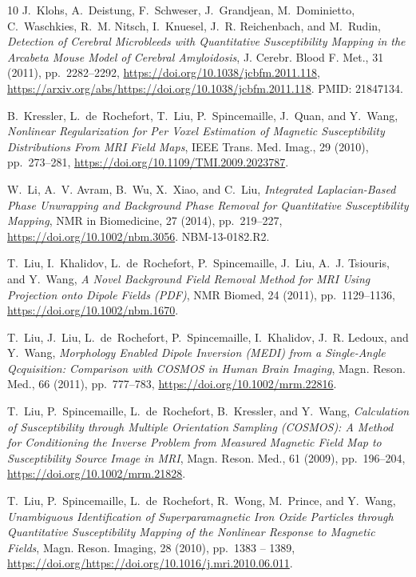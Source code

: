 \documentclass[reqno]{siamonline1116}
\numberwithin{theorem}{section}
\numberwithin{equation}{section}
\begin{document}
\begin{thebibliography}{10}
{\sc J.~Klohs, A.~Deistung, F.~Schweser, J.~Grandjean, M.~Dominietto,
  C.~Waschkies, R.~M. Nitsch, I.~Knuesel, J.~R. Reichenbach, and M.~Rudin},
  {\em {Detection of Cerebral Microbleeds with Quantitative Susceptibility
  Mapping in the Arcabeta Mouse Model of Cerebral Amyloidosis}}, J. Cerebr.
  Blood F. Met., 31 (2011), pp.~2282--2292,
  \url{https://doi.org/10.1038/jcbfm.2011.118},
  \url{https://arxiv.org/abs/https://doi.org/10.1038/jcbfm.2011.118}.
\newblock PMID: 21847134.

{\sc B.~Kressler, L.~de~Rochefort, T.~Liu, P.~Spincemaille, J.~Quan, and
  Y.~Wang}, {\em {Nonlinear Regularization for Per Voxel Estimation of Magnetic
  Susceptibility Distributions From MRI Field Maps}}, IEEE Trans. Med. Imag.,
  29 (2010), pp.~273--281, \url{https://doi.org/10.1109/TMI.2009.2023787}.

{\sc W.~Li, A.~V. Avram, B.~Wu, X.~Xiao, and C.~Liu}, {\em {Integrated
  Laplacian-Based Phase Unwrapping and Background Phase Removal for
  Quantitative Susceptibility Mapping}}, NMR in Biomedicine, 27 (2014),
  pp.~219--227, \url{https://doi.org/10.1002/nbm.3056}.
\newblock NBM-13-0182.R2.

{\sc T.~Liu, I.~Khalidov, L.~de~Rochefort, P.~Spincemaille, J.~Liu, A.~J.
  Tsiouris, and Y.~Wang}, {\em {A Novel Background Field Removal Method for MRI
  Using Projection onto Dipole Fields (PDF)}}, NMR Biomed, 24 (2011),
  pp.~1129--1136, \url{https://doi.org/10.1002/nbm.1670}.

{\sc T.~Liu, J.~Liu, L.~de~Rochefort, P.~Spincemaille, I.~Khalidov, J.~R.
  Ledoux, and Y.~Wang}, {\em {Morphology Enabled Dipole Inversion (MEDI) from a
  Single-Angle Qcquisition: Comparison with COSMOS in Human Brain Imaging}},
  Magn. Reson. Med., 66 (2011), pp.~777--783,
  \url{https://doi.org/10.1002/mrm.22816}.

{\sc T.~Liu, P.~Spincemaille, L.~de~Rochefort, B.~Kressler, and Y.~Wang}, {\em
  {Calculation of Susceptibility through Multiple Orientation Sampling
  (COSMOS): A Method for Conditioning the Inverse Problem from Measured
  Magnetic Field Map to Susceptibility Source Image in MRI}}, Magn. Reson.
  Med., 61 (2009), pp.~196--204, \url{https://doi.org/10.1002/mrm.21828}.

{\sc T.~Liu, P.~Spincemaille, L.~de~Rochefort, R.~Wong, M.~Prince, and
  Y.~Wang}, {\em {Unambiguous Identification of Superparamagnetic Iron Oxide
  Particles through Quantitative Susceptibility Mapping of the Nonlinear
  Response to Magnetic Fields}}, Magn. Reson. Imaging, 28 (2010), pp.~1383 --
  1389, \url{https://doi.org/https://doi.org/10.1016/j.mri.2010.06.011}.


\end{thebibliography}
\end{document}

